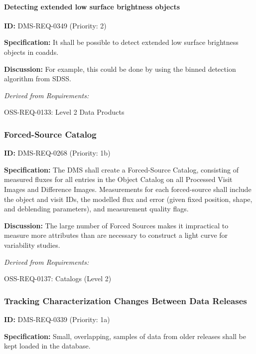 \documentclass[SE,toc,lsstdraft]{lsstdoc}
\begin{document}
\paragraph{Detecting extended  low surface brightness objects}\hfill  %

\label{DMS-REQ-0349}
\textbf{ID:} DMS-REQ-0349 (Priority: 2)

\textbf{Specification: }It shall be possible to detect extended low surface brightness objects in coadds.

\textbf{Discussion: }For example, this could be done by using the binned detection algorithm from SDSS.

\emph{Derived from Requirements:}

OSS-REQ-0133:
Level 2 Data Products \newline

\subsubsection{Forced-Source Catalog}

\label{DMS-REQ-0268}
\textbf{ID:} DMS-REQ-0268 (Priority: 1b)

\textbf{Specification:} The DMS shall create a Forced-Source Catalog, consisting of measured fluxes for all entries in the Object Catalog on all Processed Visit Images and Difference Images. Measurements for each forced-source shall include the object and visit IDs, the modelled flux and error (given fixed position, shape, and deblending parameters), and measurement quality flags.

\textbf{Discussion: }The large number of Forced Sources makes it impractical to measure more attributes than are necessary to construct a light curve for variability studies.

\emph{Derived from Requirements:}

OSS-REQ-0137:
Catalogs (Level 2) \newline

\subsubsection{Tracking Characterization Changes Between Data Releases}

\label{DMS-REQ-0339}
\textbf{ID:} DMS-REQ-0339 (Priority: 1a)

\textbf{Specification:} Small, overlapping, samples of data from older releases shall be kept loaded in the database.
\end{document}
